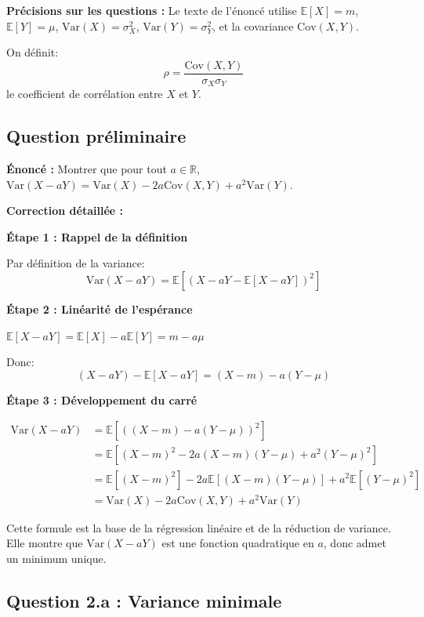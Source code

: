 \documentclass[12pt,a4paper]{article}
\theoremstyle{definition}
\newcommand{\E}{\mathbb{E}}
\newcommand{\Var}{\mathrm{Var}}
\newcommand{\Cov}{\mathrm{Cov}}
\newcommand{\R}{\mathbb{R}}
\begin{document}
\textbf{Précisions sur les questions :} Le texte de l'énoncé utilise $\E[X] = m$, $\E[Y] = \mu$, $\Var(X) = \sigma_X^2$, $\Var(Y) = \sigma_Y^2$, et la covariance $\Cov(X,Y)$.

On définit:
\[
\rho = \frac{\Cov(X,Y)}{\sigma_X \sigma_Y}
\]
le coefficient de corrélation entre $X$ et $Y$.

\subsection{Question préliminaire}

\textbf{Énoncé :} Montrer que pour tout $a \in \R$, $\Var(X - aY) = \Var(X) - 2a\Cov(X,Y) + a^2\Var(Y)$.

\textbf{Correction détaillée :}

\textbf{Étape 1 : Rappel de la définition}

Par définition de la variance:
\[
\Var(X - aY) = \E[(X - aY - \E[X - aY])^2]
\]

\textbf{Étape 2 : Linéarité de l'espérance}

$\E[X - aY] = \E[X] - a\E[Y] = m - a\mu$

Donc:
\[
(X - aY) - \E[X - aY] = (X - m) - a(Y - \mu)
\]

\textbf{Étape 3 : Développement du carré}

\begin{align*}
\Var(X - aY) &= \E\left[ ((X-m) - a(Y-\mu))^2 \right] \\
&= \E\left[ (X-m)^2 - 2a(X-m)(Y-\mu) + a^2(Y-\mu)^2 \right] \\
&= \E[(X-m)^2] - 2a\E[(X-m)(Y-\mu)] + a^2\E[(Y-\mu)^2] \\
&= \Var(X) - 2a\Cov(X,Y) + a^2\Var(Y)
\end{align*}

\begin{astuce}
Cette formule est la base de la régression linéaire et de la réduction de variance. Elle montre que $\Var(X - aY)$ est une fonction quadratique en $a$, donc admet un minimum unique.
\end{astuce}

\subsection{Question 2.a : Variance minimale}
\end{document}
